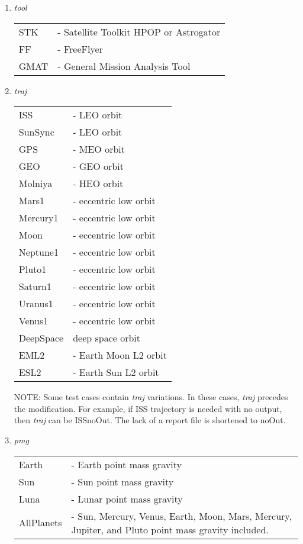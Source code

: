 \begin{enumerate}
  \item \emph{tool}

  \begin{tabular}{ll}
    STK  & - Satellite Toolkit HPOP or Astrogator\\
    FF   & - FreeFlyer\\
    GMAT & - General Mission Analysis Tool\\
  \end{tabular}

  \item \emph{traj}

  \begin{tabular}{ll}
    ISS & - LEO orbit\\
    SunSync & - LEO orbit\\
    GPS & - MEO orbit\\
    GEO & - GEO orbit\\
    Molniya & - HEO orbit\\
    Mars1 & - eccentric low orbit\\
    Mercury1 & - eccentric low orbit\\
    Moon & - eccentric low orbit\\
    Neptune1 & - eccentric low orbit\\
    Pluto1 & - eccentric low orbit\\
    Saturn1 & - eccentric low orbit\\
    Uranus1 & - eccentric low orbit\\
    Venus1 & - eccentric low orbit\\
    DeepSpace & deep space orbit\\
    EML2 & - Earth Moon L2 orbit\\
    ESL2 & - Earth Sun L2 orbit\\
  \end{tabular}

NOTE:  Some test cases contain \emph{traj} variations. In these
cases, \emph{traj} precedes the modification. For example, if ISS
trajectory is needed with no output, then \emph{traj} can be
ISSnoOut. The lack of a report file is shortened to noOut.

  \item \emph{pmg}

  \begin{tabular}{ll}
    Earth & - Earth point mass gravity \\
    Sun & - Sun point mass gravity\\
    Luna & - Lunar point mass gravity\\
    AllPlanets & - Sun, Mercury, Venus, Earth, Moon, Mars, Mercury, Jupiter, and
    Pluto point mass gravity included.\\
  \end{tabular}


\end{enumerate}
